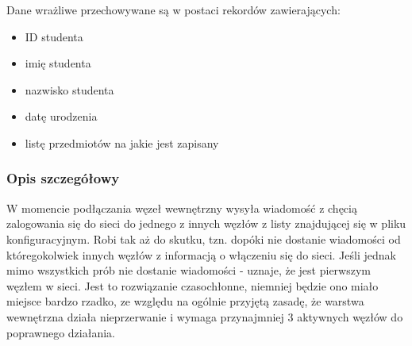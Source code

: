 \par{Dane wrażliwe przechowywane są w postaci rekordów zawierających:}

\begin{itemize}
\item ID studenta
\item imię studenta
\item nazwisko studenta
\item datę urodzenia
\item listę przedmiotów na jakie jest zapisany
\end{itemize}

\subsubsection*[Opis szczegółowy]{Opis szczegółowy}


\par{W momencie podłączania węzeł wewnętrzny wysyła wiadomość z chęcią zalogowania się do sieci do jednego z innych węzłów z listy znajdującej się w pliku konfiguracyjnym. Robi tak aż do skutku, tzn. dopóki nie dostanie wiadomości od któregokolwiek innych węzłów z informacją o włączeniu się do sieci. Jeśli jednak mimo wszystkich prób nie dostanie wiadomości - uznaje, że jest pierwszym węzłem w sieci. Jest to rozwiązanie czasochłonne, niemniej będzie ono miało miejsce bardzo rzadko, ze względu na ogólnie przyjętą zasadę, że warstwa wewnętrzna działa nieprzerwanie i wymaga przynajmniej 3 aktywnych węzłów do poprawnego działania.}

